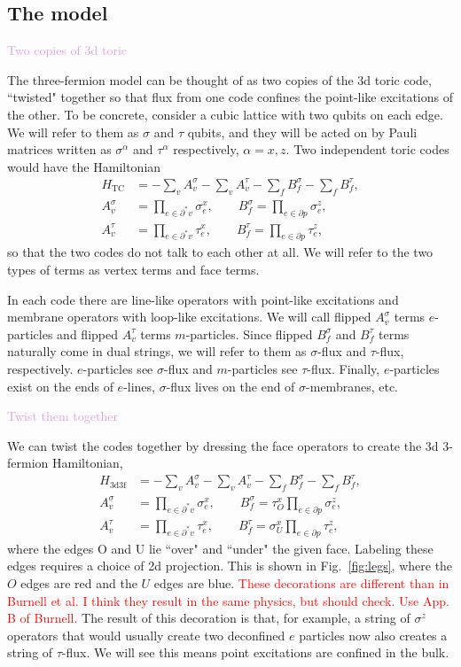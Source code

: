 \documentclass[twocolumn, longbibliography]{revtex4-2}
\newcommand{\note}[1]{\textcolor{red}{#1}}
\newcommand{\outline}[1]{\textcolor{Plum}{#1}}
\newcommand{\TC}{\text{TC}}
\newcommand{\nn}{\nonumber\\}
\newcommand{\tdtf}{\text{3d3f}}
\begin{document}
\subsection{The model}
	
\outline{Two copies of 3d toric}
	
The three-fermion model can be thought of as two copies of the 3d toric code, ``twisted" together so that flux from one code confines the point-like excitations of the other. To be concrete, consider a cubic lattice with two qubits on each edge. We will refer to them as $\sigma$ and $\tau$ qubits, and they will be acted on by Pauli matrices written as $\sigma^\alpha$ and $\tau^\alpha$ respectively, $\alpha = x,z$. Two independent toric codes would have the Hamiltonian 
\begin{align}
H_{\TC} &= -\sum_vA_v^{\sigma}-\sum_vA_v^{\tau}-\sum_fB_f^{\sigma}-\sum_fB_f^{\tau},\nn
A_v^{\sigma} &= \prod_{e\in \partial^*v}\sigma_e^x, \qquad B_f^{\sigma} = \prod_{e\in\partial p}\sigma_e^z,\nn
A_v^{\tau} &= \prod_{e\in \partial^*v}\tau_e^x, \qquad B_f^{\tau} = \prod_{e\in\partial p}\tau_e^z, 
\label{eqn:toric}
\end{align}
so that the two codes do not talk to each other at all. We will refer to the two types of terms as vertex terms and face terms. 
	
In each code there are line-like operators with point-like excitations and membrane operators with loop-like excitations. We will call flipped $A_v^\sigma$ terms $e$-particles and flipped $A_v^\tau$ terms $m$-particles. Since flipped $B_f^\sigma$ and $B_f^\tau$ terms naturally come in dual strings, we will refer to them as $\sigma$-flux and $\tau$-flux, respectively. $e$-particles see $\sigma$-flux and $m$-particles see $\tau$-flux. Finally, $e$-particles exist on the ends of $e$-lines, $\sigma$-flux lives on the end of $\sigma$-membranes, etc.
	
\outline{Twist them together}
	
We can twist the codes together by dressing the face operators to create the 3d 3-fermion Hamiltonian,
\begin{align}
H_{\tdtf} &= -\sum_vA_v^{\sigma}-\sum_vA_v^{\tau}-\sum_fB_f^{\sigma}-\sum_fB_f^{\tau},\nn
A_v^{\sigma} &= \prod_{e\in \partial^*v}\sigma_e^x, \qquad B_f^{\sigma} = \tau_O^x\prod_{e\in\partial p}\sigma_e^z,\nn
A_v^{\tau} &= \prod_{e\in \partial^*v}\tau_e^x, \qquad B_f^{\tau} = \sigma^x_U\prod_{e\in\partial p}\tau_e^z, 
\label{eqn:3d3f}
\end{align}
where the edges O and U lie ``over" and ``under" the given face. Labeling these edges requires a choice of 2d projection. This is shown in Fig.~\ref{fig:legs}, where the $O$ edges are red and the $U$ edges are blue. \note{These decorations are different than in Burnell et al. I think they result in the same physics, but should check. Use App. B of Burnell.} The result of this decoration is that, for example, a string of $\sigma^z$ operators that would usually create two deconfined $e$ particles now also creates a string of $\tau$-flux. We will see this means point excitations are confined in the bulk.
	
\end{document}
